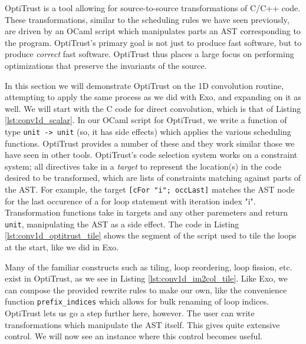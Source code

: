 \documentclass[acmsmall, nonacm=true]{acmart}
\begin{document}
OptiTrust is a tool allowing for source-to-source transformations of C/C++ code. These transformations, similar to the scheduling rules we have seen previously, are driven by an OCaml script which manipulates parts an AST corresponding to the program. OptiTrust's primary goal is not just to produce fast software, but to produce \textit{correct} fast software. OptiTrust thus places a large focus on performing optimizations that preserve the invariants of the source.

In this section we will demonstrate OptiTrust on the 1D convolution routine, attempting to apply the same process as we did with Exo, and expanding on it as well. We will start with the C code for direct convolution, which is that of Listing \ref{lst:conv1d_scalar}. In our OCaml script for OptiTrust, we write a function of type \verb|unit -> unit| (so, it has side effects) which applies the various scheduling functions. OptiTrust provides a number of these and they work similar those we have seen in other tools. OptiTrust's code selection system works on a constraint system; all directives take in a \textit{target} to represent the location(s) in the code desired to be transformed, which are lists of constraints matching against parts of the AST. For example, the target \verb|[cFor "i"; occLast]| matches the AST node for the last occurence of a for loop statement with iteration index "i". Transformation functions take in targets and any other paremeters and return \verb|unit|, manipulating the AST as a side effect. The code in Listing \ref{lst:conv1d_optitrust_tile} shows the segment of the script used to tile the loops at the start, like we did in Exo.

Many of the familiar constructs such as tiling, loop reordering, loop fission, etc.  exist in OptiTrust, as we see in Listing \ref{lst:conv1d_im2col_tile}. Like Exo, we can compose the provided rewrite rules to make our own, like the convenience function \verb|prefix_indices| which allows for bulk renaming of loop indices. OptiTrust lets us go a step further here, however. The user can write transformations which manipulate the AST itself. This gives quite extensive control. We will now see an instance where this control becomes useful.
\end{document}
